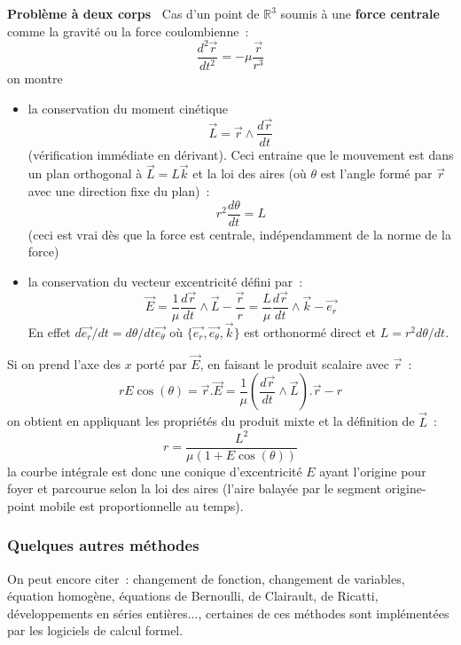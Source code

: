 \documentclass[a4paper,11pt]{article}
\newcommand{\R}{{\mathbb{R}}}
\begin{document}
\begin{giacjshere}
{\bf Probl\`eme \`a deux corps~} 
Cas d'un point de $\R^3$
soumis \`a une {\bf force centrale}
comme la gravit\'e ou la force coulombienne~:
$$\frac{d^2 \overrightarrow{r}}{dt^2}=-\mu \frac{\overrightarrow{r}}{r^3}$$ 
on montre
\begin{itemize}
\item  la conservation du moment cin\'etique 
$$\overrightarrow{L}=
\overrightarrow{r} \wedge \frac{d \overrightarrow{r}}{dt}$$
(v\'erification imm\'ediate en d\'erivant).
Ceci entraine que
le mouvement est dans un plan orthogonal \`a 
$\overrightarrow{L}=L\overrightarrow{k}$
et la loi des aires (o\`u $\theta$ est l'angle form\'e par 
$\overrightarrow{r}$ avec une direction fixe du plan)~:
$$r^2 \frac{d\theta}{dt}=L$$
(ceci est vrai d\`es que la force est centrale, ind\'ependamment
de la norme de la force)
\item la conservation du vecteur excentricit\'e d\'efini par~:
\[ \overrightarrow{E}= \frac{1}{\mu} \frac{d\overrightarrow{r}}{dt} \wedge 
\overrightarrow{L} - \frac{\overrightarrow{r}}{r} 
= \frac{L }{\mu} \frac{d\overrightarrow{r}}{dt} \wedge 
\overrightarrow{k} - \overrightarrow{e_r} \]
En effet $d \overrightarrow{e_r}/dt=d\theta/dt
\overrightarrow{e_\theta}$ o\`u $\{ \overrightarrow{e_r},
\overrightarrow{e_\theta}, \overrightarrow{k} \}$ est orthonorm\'e direct
et $L=r^2 d\theta/dt$.
\end{itemize}
Si on prend l'axe des $x$ port\'e par $\overrightarrow{E}$,
en faisant le produit scalaire avec $\overrightarrow{r}$~:
$$rE \cos(\theta)=\overrightarrow{r}.\overrightarrow{E}
= \frac{1}{\mu} 
(\frac{d\overrightarrow{r}}{dt} \wedge \overrightarrow{L}) . \overrightarrow{r} - r$$
on obtient en appliquant les propri\'et\'es du produit mixte et la
d\'efinition de $\overrightarrow{L}$~:
\[ r = \frac{L^2}{\mu(1+E \cos(\theta))}\]
la courbe int\'egrale est donc une conique d'excentricit\'e $E$
ayant l'origine pour foyer et parcourue selon la loi des aires
(l'aire balay\'ee par le segment origine-point mobile est
proportionnelle au temps).

\subsubsection{Quelques autres m\'ethodes}
On peut encore citer~: 
changement de fonction, changement de variables, 
\'equation homog\`ene, \'equations de Bernoulli,
de Clairault, de Ricatti, d\'eveloppements en s\'eries
enti\`eres..., certaines de ces m\'ethodes sont
impl\'ement\'ees par les logiciels de calcul formel.


\end{giacjshere}
\end{document}
